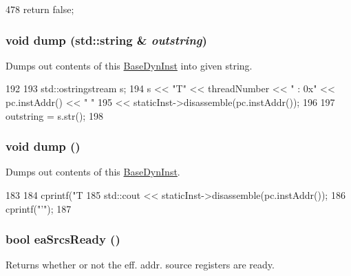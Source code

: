 \begin{DoxyCode}
478 { return false; }
\end{DoxyCode}
\hypertarget{classBaseDynInst_a5d337b0f151368459d1a95a6470f18ca}{
\subsubsection[{dump}]{\setlength{\rightskip}{0pt plus 5cm}void dump (std::string \& {\em outstring})}}
\label{classBaseDynInst_a5d337b0f151368459d1a95a6470f18ca}
Dumps out contents of this \hyperlink{classBaseDynInst}{BaseDynInst} into given string. 


\begin{DoxyCode}
192 {
193     std::ostringstream s;
194     s << "T" << threadNumber << " : 0x" << pc.instAddr() << " "
195       << staticInst->disassemble(pc.instAddr());
196 
197     outstring = s.str();
198 }
\end{DoxyCode}
\hypertarget{classBaseDynInst_accd2600060dbaee3a3b41aed4034c63c}{
\subsubsection[{dump}]{\setlength{\rightskip}{0pt plus 5cm}void dump ()}}
\label{classBaseDynInst_accd2600060dbaee3a3b41aed4034c63c}
Dumps out contents of this \hyperlink{classBaseDynInst}{BaseDynInst}. 


\begin{DoxyCode}
183 {
184     cprintf("T%
185     std::cout << staticInst->disassemble(pc.instAddr());
186     cprintf("'\n");
187 }
\end{DoxyCode}
\hypertarget{classBaseDynInst_ae3a07556a5b5d8248cbfb1c99561340d}{
\subsubsection[{eaSrcsReady}]{\setlength{\rightskip}{0pt plus 5cm}bool eaSrcsReady ()}}
\label{classBaseDynInst_ae3a07556a5b5d8248cbfb1c99561340d}
Returns whether or not the eff. addr. source registers are ready. 

